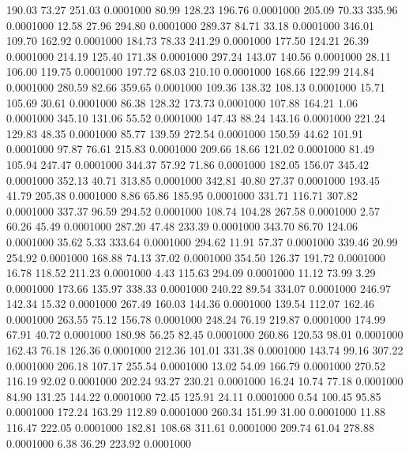  190.03   73.27  251.03   0.0001000
  80.99  128.23  196.76   0.0001000
 205.09   70.33  335.96   0.0001000
  12.58   27.96  294.80   0.0001000
 289.37   84.71   33.18   0.0001000
 346.01  109.70  162.92   0.0001000
 184.73   78.33  241.29   0.0001000
 177.50  124.21   26.39   0.0001000
 214.19  125.40  171.38   0.0001000
 297.24  143.07  140.56   0.0001000
  28.11  106.00  119.75   0.0001000
 197.72   68.03  210.10   0.0001000
 168.66  122.99  214.84   0.0001000
 280.59   82.66  359.65   0.0001000
 109.36  138.32  108.13   0.0001000
  15.71  105.69   30.61   0.0001000
  86.38  128.32  173.73   0.0001000
 107.88  164.21    1.06   0.0001000
 345.10  131.06   55.52   0.0001000
 147.43   88.24  143.16   0.0001000
 221.24  129.83   48.35   0.0001000
  85.77  139.59  272.54   0.0001000
 150.59   44.62  101.91   0.0001000
  97.87   76.61  215.83   0.0001000
 209.66   18.66  121.02   0.0001000
  81.49  105.94  247.47   0.0001000
 344.37   57.92   71.86   0.0001000
 182.05  156.07  345.42   0.0001000
 352.13   40.71  313.85   0.0001000
 342.81   40.80   27.37   0.0001000
 193.45   41.79  205.38   0.0001000
   8.86   65.86  185.95   0.0001000
 331.71  116.71  307.82   0.0001000
 337.37   96.59  294.52   0.0001000
 108.74  104.28  267.58   0.0001000
   2.57   60.26   45.49   0.0001000
 287.20   47.48  233.39   0.0001000
 343.70   86.70  124.06   0.0001000
  35.62    5.33  333.64   0.0001000
 294.62   11.91   57.37   0.0001000
 339.46   20.99  254.92   0.0001000
 168.88   74.13   37.02   0.0001000
 354.50  126.37  191.72   0.0001000
  16.78  118.52  211.23   0.0001000
   4.43  115.63  294.09   0.0001000
  11.12   73.99    3.29   0.0001000
 173.66  135.97  338.33   0.0001000
 240.22   89.54  334.07   0.0001000
 246.97  142.34   15.32   0.0001000
 267.49  160.03  144.36   0.0001000
 139.54  112.07  162.46   0.0001000
 263.55   75.12  156.78   0.0001000
 248.24   76.19  219.87   0.0001000
 174.99   67.91   40.72   0.0001000
 180.98   56.25   82.45   0.0001000
 260.86  120.53   98.01   0.0001000
 162.43   76.18  126.36   0.0001000
 212.36  101.01  331.38   0.0001000
 143.74   99.16  307.22   0.0001000
 206.18  107.17  255.54   0.0001000
  13.02   54.09  166.79   0.0001000
 270.52  116.19   92.02   0.0001000
 202.24   93.27  230.21   0.0001000
  16.24   10.74   77.18   0.0001000
  84.90  131.25  144.22   0.0001000
  72.45  125.91   24.11   0.0001000
   0.54  100.45   95.85   0.0001000
 172.24  163.29  112.89   0.0001000
 260.34  151.99   31.00   0.0001000
  11.88  116.47  222.05   0.0001000
 182.81  108.68  311.61   0.0001000
 209.74   61.04  278.88   0.0001000
   6.38   36.29  223.92   0.0001000
